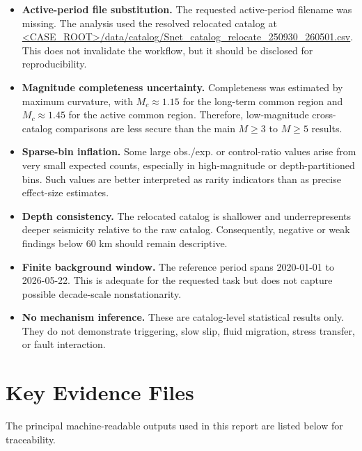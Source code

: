 \documentclass[11pt]{article}
\begin{document}
\begin{itemize}[leftmargin=1.5em]
    \item \textbf{Active-period file substitution.} The requested active-period filename was missing. The analysis used the resolved relocated catalog at \url{<CASE_ROOT>/data/catalog/Snet_catalog_relocate_250930_260501.csv}. This does not invalidate the workflow, but it should be disclosed for reproducibility.
    \item \textbf{Magnitude completeness uncertainty.} Completeness was estimated by maximum curvature, with $M_c \approx 1.15$ for the long-term common region and $M_c \approx 1.45$ for the active common region. Therefore, low-magnitude cross-catalog comparisons are less secure than the main $M\geq 3$ to $M\geq 5$ results.
    \item \textbf{Sparse-bin inflation.} Some large obs./exp. or control-ratio values arise from very small expected counts, especially in high-magnitude or depth-partitioned bins. Such values are better interpreted as rarity indicators than as precise effect-size estimates.
    \item \textbf{Depth consistency.} The relocated catalog is shallower and underrepresents deeper seismicity relative to the raw catalog. Consequently, negative or weak findings below 60 km should remain descriptive.
    \item \textbf{Finite background window.} The reference period spans 2020-01-01 to 2026-05-22. This is adequate for the requested task but does not capture possible decade-scale nonstationarity.
    \item \textbf{No mechanism inference.} These are catalog-level statistical results only. They do not demonstrate triggering, slow slip, fluid migration, stress transfer, or fault interaction.
\end{itemize}

\section{Key Evidence Files}
The principal machine-readable outputs used in this report are listed below for traceability.
\end{document}
